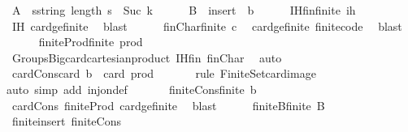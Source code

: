 \begin{isabellebody}
\ {\isacharquery}A\ {\isacharequal}\ {\isachardoublequoteopen}{\isacharbraceleft}s{\isacharcolon}{\isacharcolon}string{\isachardot}\ length\ s\ {\isasymle}\ Suc\ k{\isacharbraceright}{\isachardoublequoteclose}\isanewline
\ \ \ \ \isamarkupfalse%
\ {\isacharquery}B\ {\isacharequal}\ {\isachardoublequoteopen}insert\ {\isacharbrackleft}{\isacharbrackright}\ {\isacharquery}b{\isachardoublequoteclose}\isanewline
\ \ \ \ \isamarkupfalse%
\ IHfin{\isacharcolon}{\isachardoublequoteopen}finite\ {\isacharquery}ih{\isachardoublequoteclose}\ \isamarkupfalse%
\ IH\ card{\isacharunderscore}ge{\isacharunderscore}{}{\isacharunderscore}finite\ \isamarkupfalse%
\ blast\isanewline
\ \ \ \ \isamarkupfalse%
\ finChar{\isacharcolon}{\isachardoublequoteopen}finite\ {\isacharquery}c{\isachardoublequoteclose}\ \isamarkupfalse%
\ card{\isacharunderscore}ge{\isacharunderscore}{}{\isacharunderscore}finite\ finite{\isacharunderscore}code\ \isamarkupfalse%
\ blast\isanewline
\ \ \ \ \isamarkupfalse%
\ finiteProd{\isacharcolon}{\isachardoublequoteopen}finite\ {\isacharquery}prod{\isachardoublequoteclose}\isanewline
\ \ \ \ \ \ \isamarkupfalse%
\ Groups{\isacharunderscore}Big{\isachardot}card{\isacharunderscore}cartesian{\isacharunderscore}product\ IHfin\ finChar\ \isamarkupfalse%
\ auto\isanewline
\ \ \ \ \isamarkupfalse%
\ cardCons{\isacharcolon}{\isachardoublequoteopen}card\ {\isacharquery}b\ {\isacharequal}\ card\ {\isacharquery}prod{\isachardoublequoteclose}\isanewline
\ \ \ \ \ \ \isamarkupfalse%
{\isacharparenleft}rule\ Finite{\isacharunderscore}Set{\isachardot}card{\isacharunderscore}image{\isacharparenright}\isanewline
\ \ \ \ \ \ \isamarkupfalse%
{\isacharparenleft}auto\ simp\ add{\isacharcolon}\ inj{\isacharunderscore}on{\isacharunderscore}def{\isacharparenright}\ \isanewline
\ \ \ \ \isamarkupfalse%
\ finiteCons{\isacharcolon}{\isachardoublequoteopen}finite\ {\isacharquery}b{\isachardoublequoteclose}\ \isamarkupfalse%
\ cardCons\ finiteProd\ card{\isacharunderscore}ge{\isacharunderscore}{}{\isacharunderscore}finite\ \isamarkupfalse%
\ blast\isanewline
\ \ \ \ \isamarkupfalse%
\ finiteB{\isacharcolon}{\isachardoublequoteopen}finite\ {\isacharquery}B{\isachardoublequoteclose}\ \isamarkupfalse%
\ finite{\isacharunderscore}insert\ finiteCons\ \isamarkupfalse%

\end{isabellebody}
